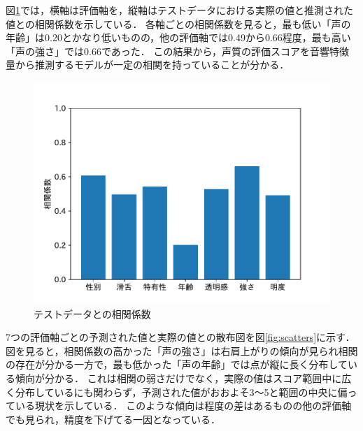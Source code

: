 図\ref{tab:score_coor}では，横軸は評価軸を，縦軸はテストデータにおける実際の値と推測された値との相関係数を示している．
各軸ごとの相関係数を見ると，最も低い「声の年齢」は0.20とかなり低いものの，他の評価軸では0.49から0.66程度，最も高い「声の強さ」では0.66であった．
この結果から，声質の評価スコアを音響特徴量から推測するモデルが一定の相関を持っていることが分かる．

\begin{figure}[htb]
  \centering
  \includegraphics[width=\linewidth]{fig/coorpdf.pdf}
  \caption{テストデータとの相関係数}
  \label{tab:score_coor}
\end{figure}

7つの評価軸ごとの予測された値と実際の値との散布図を図\ref{fig:scatters}に示す．
図を見ると，相関係数の高かった「声の強さ」は右肩上がりの傾向が見られ相関の存在が分かる一方で，最も低かった「声の年齢」では点が縦に長く分布している傾向が分かる．
これは相関の弱さだけでなく，実際の値はスコア範囲中に広く分布しているにも関わらず，予測された値がおおよそ3〜5と範囲の中央に偏っている現状を示している．
このような傾向は程度の差はあるものの他の評価軸でも見られ，精度を下げてる一因となっている．

